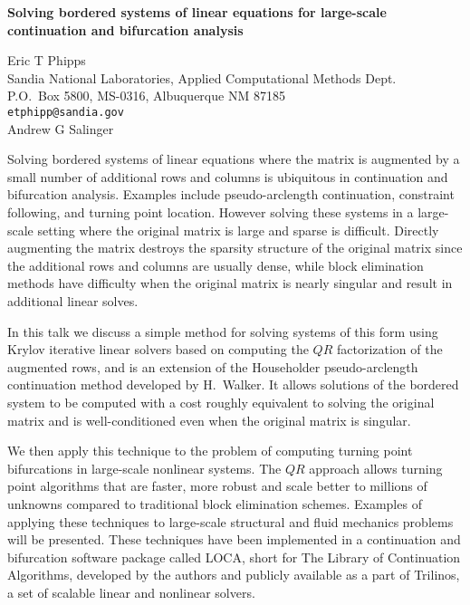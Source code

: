 \documentclass[twosided]{report}
\begin{document}
\begin{center}
{\large			%
{\bf Solving bordered systems of linear equations for large-scale \\
	continuation and bifurcation analysis}}

	Eric T Phipps \\
	Sandia National Laboratories, Applied Computational Methods Dept. \\
	P.O.~Box 5800, MS-0316, Albuquerque NM 87185 \\
	{\tt etphipp@sandia.gov} \\
	Andrew G Salinger
\end{center}
Solving bordered systems of linear equations where the
matrix is augmented by a small number of additional rows and
columns is ubiquitous in continuation and bifurcation
analysis. Examples include pseudo-arclength continuation,
constraint following, and turning point location. However
solving these systems in a large-scale setting where the
original matrix is large and sparse is difficult. Directly
augmenting the matrix destroys the sparsity structure of the
original matrix since the additional rows and columns are
usually dense, while block elimination methods have
difficulty when the original matrix is nearly singular and
result in additional linear solves.

In this talk we
discuss a simple method for solving systems of this form
using Krylov iterative linear solvers based on computing the
$QR$ factorization of the augmented rows, and is an
extension of the Householder pseudo-arclength continuation
method developed by H.~Walker. It allows solutions of the
bordered system to be computed with a cost roughly
equivalent to solving the original matrix and is
well-conditioned even when the original matrix is singular.


We then apply this technique to the problem of computing
turning point bifurcations in large-scale nonlinear systems.
The $QR$ approach allows turning point algorithms that are
faster, more robust and scale better to millions of unknowns
compared to traditional block elimination schemes. Examples
of applying these techniques to large-scale structural and
fluid mechanics problems will be presented. These techniques
have been implemented in a continuation and bifurcation
software package called LOCA, short for The Library of
Continuation Algorithms, developed by the authors and
publicly available as a part of Trilinos, a set of scalable
linear and nonlinear solvers.
\end{document}
